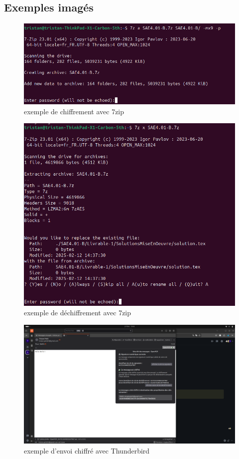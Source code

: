 \documentclass[../Livrable1.tex]{subfiles}
\begin{document}
\subsection{Exemples imagés}
\begin{figure}[h]
    \centering
    \includegraphics[width=1\textwidth]{../images/7z_chiffrer.png}
    \caption{exemple de chiffrement avec 7zip}
    \label{fig:solution1}
\end{figure}
\begin{figure}[h]
    \centering
    \includegraphics[width=1\textwidth]{../images/7z_dechiffr.png}
    \caption{exemple de déchiffrement avec 7zip}
    \label{fig:solution2}
\end{figure}
\begin{figure}[h]
    \centering
    \includegraphics[width=1\textwidth]{../images/Envoi_chiffre.png}
    \caption{exemple d'envoi chiffré avec Thunderbird}
    \label{fig:solution3}
\end{figure}
\end{document}
